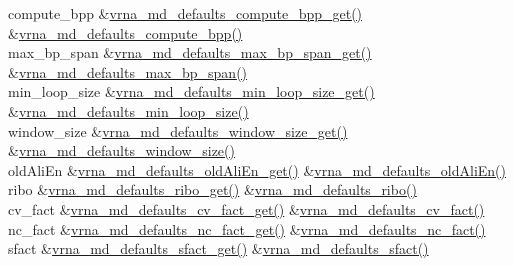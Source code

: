 \begin{DoxyRefList}
\begin{longtabu}
compute\+\_\+bpp &\hyperlink{group__model__details_gaa3a537e61fbe0518673bf9f73fd820f3}{vrna\+\_\+md\+\_\+defaults\+\_\+compute\+\_\+bpp\+\_\+get()} &\hyperlink{group__model__details_gaf1b5db10f1f476767f9a95f8a78e3132}{vrna\+\_\+md\+\_\+defaults\+\_\+compute\+\_\+bpp()} \\
max\+\_\+bp\+\_\+span &\hyperlink{group__model__details_gaa60f989e062fecd4d4bac89c1883da85}{vrna\+\_\+md\+\_\+defaults\+\_\+max\+\_\+bp\+\_\+span\+\_\+get()} &\hyperlink{group__model__details_ga4c4bc962f09b4480cb8499f1cf8ae4ec}{vrna\+\_\+md\+\_\+defaults\+\_\+max\+\_\+bp\+\_\+span()} \\
min\+\_\+loop\+\_\+size &\hyperlink{group__model__details_ga5cc691174a75c652807dc361b617632a}{vrna\+\_\+md\+\_\+defaults\+\_\+min\+\_\+loop\+\_\+size\+\_\+get()} &\hyperlink{group__model__details_gac152f1e78c1058a10261022c8dfda0f7}{vrna\+\_\+md\+\_\+defaults\+\_\+min\+\_\+loop\+\_\+size()} \\
window\+\_\+size &\hyperlink{group__model__details_ga670146a9aa3ba77f4d422d60b7c30ac9}{vrna\+\_\+md\+\_\+defaults\+\_\+window\+\_\+size\+\_\+get()} &\hyperlink{group__model__details_ga7b802ce0e8c3181bf5cb580de6d5b26a}{vrna\+\_\+md\+\_\+defaults\+\_\+window\+\_\+size()} \\
old\+Ali\+En &\hyperlink{group__model__details_ga2374492b5019df88022fe4c05f0f3630}{vrna\+\_\+md\+\_\+defaults\+\_\+old\+Ali\+En\+\_\+get()} &\hyperlink{group__model__details_ga41521d5b9fb7e0f31e7ea73f5792afab}{vrna\+\_\+md\+\_\+defaults\+\_\+old\+Ali\+En()} \\
ribo &\hyperlink{group__model__details_ga169027f0c0561ea7d87b655e4b336bfc}{vrna\+\_\+md\+\_\+defaults\+\_\+ribo\+\_\+get()} &\hyperlink{group__model__details_ga937c45e1d06fd6168730a9b08d130be3}{vrna\+\_\+md\+\_\+defaults\+\_\+ribo()} \\
cv\+\_\+fact &\hyperlink{group__model__details_gae59c68393807217b0a2497adb64d3ee3}{vrna\+\_\+md\+\_\+defaults\+\_\+cv\+\_\+fact\+\_\+get()} &\hyperlink{group__model__details_gad3a3f40baafd91a6ce80a91a68e20053}{vrna\+\_\+md\+\_\+defaults\+\_\+cv\+\_\+fact()} \\
nc\+\_\+fact &\hyperlink{group__model__details_ga7ac759eaa7159bf5f022745f5da59508}{vrna\+\_\+md\+\_\+defaults\+\_\+nc\+\_\+fact\+\_\+get()} &\hyperlink{group__model__details_gac35e596c850dce3ad55c49119fd7d471}{vrna\+\_\+md\+\_\+defaults\+\_\+nc\+\_\+fact()} \\
sfact &\hyperlink{group__model__details_gab2df6aab954b63fd3592d18e90285dae}{vrna\+\_\+md\+\_\+defaults\+\_\+sfact\+\_\+get()} &\hyperlink{group__model__details_ga3f73d3029d3d0025d4cc311510cd95a3}{vrna\+\_\+md\+\_\+defaults\+\_\+sfact()} \\
\end{longtabu}


\end{DoxyRefList}
